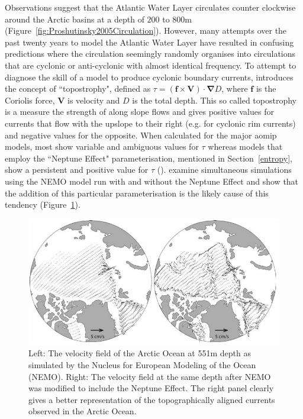 \documentclass[12pt,a4paper]{report}
\newcommand*\figref[1]{Figure~\ref{#1}}
\newcommand*\secref[1]{Section~\ref{#1}}
\begin{document}
Observations suggest that the Atlantic Water Layer circulates counter clockwise around the
 Arctic basins at a depth of $200$ to $800\mathrm{m}$
 (\figref{fig:Proshutinsky2005Circulation}). However, many attempts over the past twenty
 years to model the Atlantic Water Layer have resulted in confusing predictions where the
 circulation seemingly randomly organises into circulations that are cyclonic or
 anti-cyclonic with almost identical frequency. To attempt to diagnose the skill of a model
 to produce cyclonic boundary currents, \cite{holloway2007water} introduces the concept of ``topostrophy",
 defined as   $\tau=(\boldsymbol{f}\times\boldsymbol{V})\cdot\boldsymbol{\nabla}D$, where
 $\boldsymbol{f}$  is the Coriolis force,  $\boldsymbol{V}$ is velocity and  $D$ is the total
 depth. This so called topostrophy is a measure the strength of along slope flows and gives
 positive values for currents that flow with the upslope to their right (e.g. for cyclonic
 rim currents) and negative values for the opposite.  When calculated for the major
 \gls{aomip} models, most show variable and ambiguous values for $\tau$  whereas models that
 employ the ``Neptune Effect" parameterisation, mentioned in \secref{entropy}, show a persistent and positive
 value for  $\tau$ (\cite{proshutinsky2011recent}). \cite{holloway2009representing} examine
 simultaneous simulations using the NEMO model run with and without the Neptune Effect and
 show that the addition of this particular parameterisation is the likely cause of this
 tendency (\figref{fig:HolloWang2009}).  


\begin{figure}
	\centering
	\includegraphics[width=\linewidth]{HolloWang2009}
	\caption[\cite{holloway2009representing}]{Left: The velocity field of the Arctic Ocean at 551m depth as simulated by the Nucleus for European Modeling of the Ocean (NEMO). Right: The velocity field at the same depth after NEMO was modified to include the Neptune Effect. The right panel clearly gives a better representation of the topographically aligned currents observed in the Arctic Ocean.  \cite{holloway2009representing}}
	\label{fig:HolloWang2009}
\end{figure}
\end{document}

